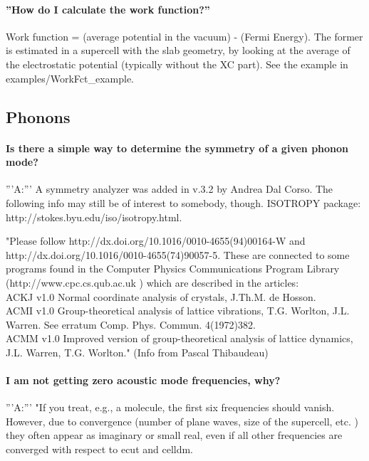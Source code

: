 \documentclass[12pt,a4paper]{article}
\begin{document}
\paragraph{''How do I calculate the work function?''}
Work function = (average potential in the vacuum) - (Fermi
Energy). The former is estimated in a supercell with the slab
geometry, by looking at the average of the electrostatic potential
(typically without the XC part). See the example in
examples/WorkFct\_example. 

\subsection{ Phonons }

\paragraph{ Is there a simple way to determine the symmetry of a given
  phonon mode?} 
'''A:''' A symmetry analyzer was added in v.3.2 by Andrea Dal
Corso. The following info may still be of interest to somebody,
though. ISOTROPY package: http://stokes.byu.edu/iso/isotropy.html.

"Please follow http://dx.doi.org/10.1016/0010-4655(94)00164-W and\\
http://dx.doi.org/10.1016/0010-4655(74)90057-5. These are connected to some 
programs found in the Computer Physics Communications Program Library 
(http://www.cpc.cs.qub.ac.uk ) which are described in the articles:\\
ACKJ v1.0 Normal coordinate analysis of crystals, J.Th.M. de Hosson.\\
ACMI v1.0 Group-theoretical analysis of lattice vibrations, T.G. Worlton, J.L. Warren. See erratum Comp. Phys. Commun. 4(1972)382.\\
ACMM v1.0 Improved version of group-theoretical analysis of lattice
dynamics, J.L. Warren, T.G. Worlton." (Info from Pascal Thibaudeau) 

\paragraph{ I am not getting zero acoustic mode frequencies, why? }
'''A:''' "If you treat, e.g., a molecule, the first six frequencies
should vanish. However, due to convergence (number of plane waves,
size of the supercell, etc. ) they often appear as imaginary or small
real, even if all other frequencies are converged with respect to ecut
and celldm. 
\end{document}
